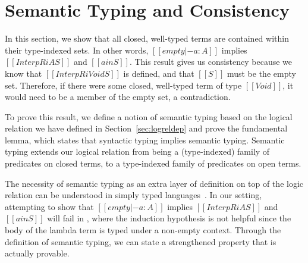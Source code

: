 \documentclass[acmsmall,screen=true,
\ifpublic review=false\else,review=true\fi
  ,anonymous=\ifanonymous true\else false\fi]{acmart}
\newcommand{\lang}{$\lambda^{U\mathbb{B}\ottkw{Id}}$\xspace}
\newcommand{\scw}[1]{}
\begin{document}
\section{Semantic Typing and Consistency}
\label{sec:logrelproof}
\scw{Would it make sense to define the notation $a \in [\![A]\!]^i$ when
there exists some $S$ such that $[[InterpR i A S]]$ and $[[a in S]]$ ?}



In this section, we show that all closed, well-typed terms are contained
within their type-indexed sets. In other words, $[[empty |- a : A]]$ implies
$[[InterpR i A S]]$ and $[[a in S]]$.  This result gives us consistency
because we know that $[[InterpR i Void S]]$ is defined, and that $[[S]]$ must
be the empty set. Therefore, if there were some closed, well-typed term of type
$[[Void]]$, it would need to be a member of the empty set, a contradiction.

To prove this result, we define a notion of semantic typing based on the
logical relation we have defined in Section~\ref{sec:logreldep} and prove the
fundamental lemma, which states that syntactic typing implies semantic typing.
Semantic typing extends our logical relation from being a (type-indexed)
family of predicates on closed terms, to a type-indexed family of predicates
on open terms.

The necessity of semantic typing as an extra layer of
definition on top of the logic relation can be understood in simply typed
languages~\citep{skorstengaard2019introduction, harpertait,
  pierce2002types}. In our setting, attempting to show that
$[[empty |- a : A]]$ implies $[[InterpR i A S]]$ and $[[a in S]]$ will fail in
, where the induction hypothesis is not helpful since the body of
the lambda term is typed under a non-empty context. Through the definition of
semantic typing, we can state a strengthened property that is actually
provable.
\end{document}
